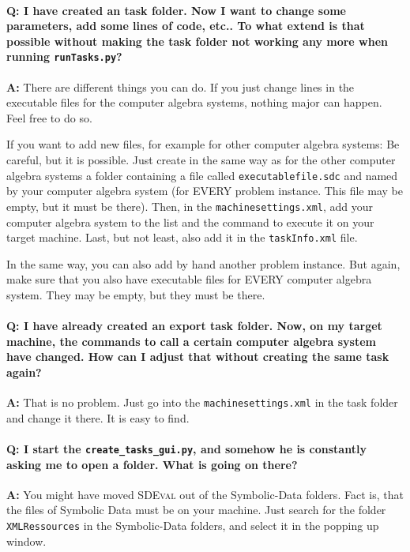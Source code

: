 \documentclass[11pt,a4paper]{amsart}
\numberwithin{equation}{section}
\theoremstyle{definition}
\begin{document}
\paragraph{\textbf{Q:} I have created an task folder. Now I want to change some parameters, add some lines of code, etc.. To what extend is that possible without making the task folder not working any more when running \texttt{runTasks.py}?}

\textbf{A:} There are different things you can do. If you just change lines in the executable files for the computer algebra systems, nothing major can happen. Feel free to do so.

If you want to add new files, for example for other computer algebra systems: Be careful, but it is possible. Just create in the same way as for the other computer algebra systems a folder containing a file called \texttt{executablefile.sdc} and named by your computer algebra system (for EVERY problem instance. This file may be empty, but it must be there). Then, in the \texttt{machinesettings.xml}, add your computer algebra system to the list and the command to execute it on your target machine. Last, but not least, also add it in the \texttt{taskInfo.xml} file.

In the same way, you can also add by hand another problem instance. But again, make sure that you also have executable files for EVERY computer algebra system. They may be empty, but they must be there.

\paragraph{\textbf{Q:} I have already created an export task folder. Now, on my target machine, the commands to call a certain computer algebra system have changed. How can I adjust that without creating the same task again?}

\textbf{A:} That is no problem. Just go into the \texttt{machinesettings.xml} in the task folder and change it there. It is easy to find.

\paragraph{\textbf{Q:} I start the \texttt{create\_tasks\_gui.py}, and somehow he is constantly asking me to open a folder. What is going on there?}

\textbf{A:} You might have moved \textsc{SDEval} out of the Symbolic-Data folders. Fact is, that the files of Symbolic Data must be on your machine. Just search for the folder \texttt{XMLRessources} in the Symbolic-Data folders, and select it in the popping up window.
\end{document}
